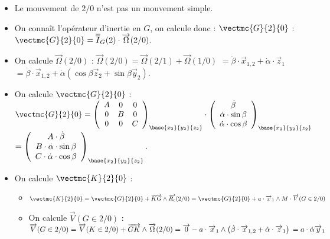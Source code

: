 \begin{multicols}{2}
 
\ifprof
\begin{corrige}
\begin{itemize}
\item Le mouvement de $2/0$ n'est pas un mouvement simple. 
\item On connaît l'opérateur d'inertie en $G$, on calcule donc : $\vectmc{G}{2}{0}$ :$
\vectmc{G}{2}{0}=\overline{\overline{I}}_G(2)\cdot \overrightarrow{\Omega}(2/0).$

\item On calcule $\overrightarrow{\Omega}(2/0)$ :
$\overrightarrow{\Omega}(2/0)=\overrightarrow{\Omega}(2/1)+\overrightarrow{\Omega}(1/0)$ 
$=\dot{\beta}\cdot \overrightarrow{x}_{1,2}+\dot{\alpha}\cdot \overrightarrow{z}_{1}$
$=\dot{\beta}\cdot \overrightarrow{x}_{1,2}
+\dot{\alpha}\left(\cos\beta\overrightarrow{z}_2+\sin\beta\overrightarrow{y}_2\right)$.

\item On calcule $\vectmc{G}{2}{0}$ : 
$
\vectmc{G}{2}{0}=\left(
\begin{array}{ccc}
A & 0 & 0 \\ 
0 & B & 0 \\ 
0 & 0 & C
\end{array}
\right)_{\base{{x}_2}{{y}_2}{{z}_2}} \cdot 
\left(
\begin{array}{c}
\dot{\beta}\\
\dot{\alpha}\cdot \sin\beta\\
\dot{\alpha}\cdot \cos\beta\\
\end{array}
\right)_{\base{{x}_2}{{y}_2}{{z}_2}}$
$=\left(
\begin{array}{c}
A\cdot \dot{\beta}\\
B\cdot \dot{\alpha}\cdot \sin\beta\\
C\cdot \dot{\alpha}\cdot \cos\beta\\
\end{array}
\right)_{\base{{x}_2}{{y}_2}{{z}_2}}.$

\item On calcule $\vectmc{K}{2}{0}$ : 
\begin{itemize}
\item $\vectmc{K}{2}{0}=\vectmc{G}{2}{0}+\overrightarrow{KG}\wedge \overrightarrow{R_c}(2/0)
=\vectmc{G}{2}{0}+a\cdot \overrightarrow{x}_1\wedge M\cdot \overrightarrow{V}(G\in 2/0)$
\item On calcule $\overrightarrow{V}(G\in 2/0)$ : 
$\overrightarrow{V}(G\in 2/0)=\overrightarrow{V}(K\in 2/0)+\overrightarrow{GK}\wedge \overrightarrow{\Omega}(2/0)=
\overrightarrow{0}-a\cdot \overrightarrow{x}_1\wedge \left(\dot{\beta}\cdot \overrightarrow{x}_{1,2}+\dot{\alpha}\cdot \overrightarrow{z}_{1}\right)\\
=a\cdot \dot{\alpha}\overrightarrow{y}_{1} $


\end{itemize}
\end{itemize}
\end{corrige}
\end{multicols}
